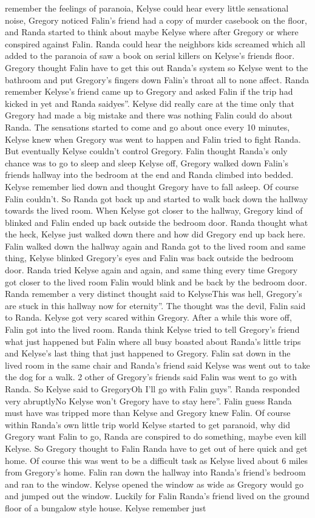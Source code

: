\documentclass[12pt]{book}
\begin{document}
remember the feelings of paranoia, Kelyse could hear every little sensational noise, Gregory noticed Falin's friend had a copy of murder casebook on the floor, and Randa started to think about maybe Kelyse where after Gregory or where conspired against Falin. Randa could hear the neighbors kids screamed which all added to the paranoia of saw a book on serial killers on Kelyse's friends floor. Gregory thought Falin have to get this out Randa's system so Kelyse went to the bathroom and put Gregory's fingers down Falin's throat all to none affect. Randa remember Kelyse's friend came up to Gregory and asked Falin if the trip had kicked in yet and Randa saidyes''. Kelyse did really care at the time only that Gregory had made a big mistake and there was nothing Falin could do about Randa. The sensations started to come and go about once every 10 minutes, Kelyse knew when Gregory was went to happen and Falin tried to fight Randa. But eventually Kelyse couldn't control Gregory. Falin thought Randa's only chance was to go to sleep and sleep Kelyse off, Gregory walked down Falin's friends hallway into the bedroom at the end and Randa climbed into bedded. Kelyse remember lied down and thought Gregory have to fall asleep. Of course Falin couldn't. So Randa got back up and started to walk back down the hallway towards the lived room. When Kelyse got closer to the hallway, Gregory kind of blinked and Falin ended up back outside the bedroom door. Randa thought what the heck, Kelyse just walked down there and how did Gregory end up back here. Falin walked down the hallway again and Randa got to the lived room and same thing, Kelyse blinked Gregory's eyes and Falin was back outside the bedroom door. Randa tried Kelyse again and again, and same thing every time Gregory got closer to the lived room Falin would blink and be back by the bedroom door. Randa remember a very distinct thought said to KelyseThis was hell, Gregory's are stuck in this hallway now for eternity''. The thought was the devil, Falin said to Randa. Kelyse got very scared within Gregory. After a while this wore off, Falin got into the lived room. Randa think Kelyse tried to tell Gregory's friend what just happened but Falin where all busy boasted about Randa's little trips and Kelyse's last thing that just happened to Gregory. Falin sat down in the lived room in the same chair and Randa's friend said Kelyse was went out to take the dog for a walk. 2 other of Gregory's friends said Falin was went to go with Randa. So Kelyse said to GregoryOh I'll go with Falin guys''. Randa responded very abruptlyNo Kelyse won't Gregory have to stay here''. Falin guess Randa must have was tripped more than Kelyse and Gregory knew Falin. Of course within Randa's own little trip world Kelyse started to get paranoid, why did Gregory want Falin to go, Randa are conspired to do something, maybe even kill Kelyse. So Gregory thought to Falin Randa have to get out of here quick and get home. Of course this was went to be a difficult task as Kelyse lived about 6 miles from Gregory's home. Falin ran down the hallway into Randa's friend's bedroom and ran to the window. Kelyse opened the window as wide as Gregory would go and jumped out the window. Luckily for Falin Randa's friend lived on the ground floor of a bungalow style house. Kelyse remember just 
\end{document}

